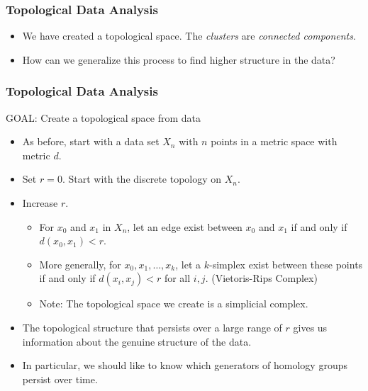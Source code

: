 \begin{frame}
\frametitle{Topological Data Analysis}
\begin{center}
\end{center}
\begin{itemize}
\item<1-> We have created a topological space. The \textit{clusters} are \textit{connected components}.
\item<2-> How can we generalize this process to find higher structure in the data?
\end{itemize}
\end{frame}
\begin{frame}
\frametitle{Topological Data Analysis}
GOAL: Create a topological space from data
\begin{itemize}
\item<1-> As before, start with a data set $X_n$ with $n$ points in a metric space with metric $d$.
\item<2-> Set $r=0$. Start with the discrete topology on $X_n$.
\item<3-> Increase $r$. 
	\begin{itemize}
	\item For $x_0$ and $x_1$ in $X_n$, let an edge exist between $x_0$ and $x_1$ if and only if $d(x_0,x_1)<r$.
	\item More generally, for $x_0, x_1, \ldots, x_k$, let a $k$-simplex exist between these points if and only if $d(x_i,x_j)<r$ for all $i, j$. (Vietoris-Rips Complex)
	\item Note: The topological space we create is a simplicial complex.
	\end{itemize}
\item<4-> The topological structure that persists over a large range of $r$ gives us information about the genuine structure of the data.
\item<5-> In particular, we should like to know which generators of homology groups persist over time.
\end{itemize}
\end{frame}

